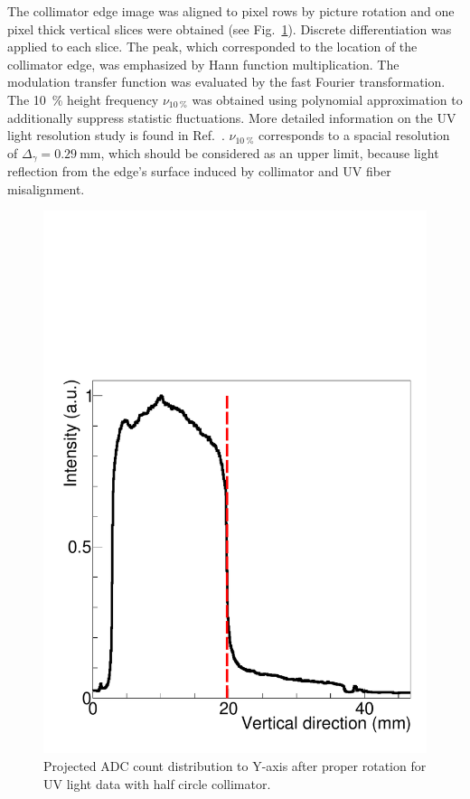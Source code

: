 \documentclass[preprint,3p,twocolumn]{elsarticle}
\begin{document}
The collimator edge image was aligned to pixel rows by picture rotation and 
one pixel thick vertical slices were obtained (see Fig.~\ref{fig:half_circle}).
Discrete differentiation was applied to each slice.
The peak,
which corresponded to the location of the collimator edge,
was emphasized by Hann function multiplication.
The modulation transfer function was evaluated by the fast Fourier transformation.
The \SI{10}{\percent} height frequency $\nu_{\SI{10}{\percent}}$ was obtained using polynomial approximation to additionally suppress statistic fluctuations.
More detailed information on the UV light resolution study is found in Ref.~\cite{Gosha}.
$\nu_{\SI{10}{\percent}}$ corresponds to a spacial resolution of $\Delta_\gamma = \SI{0.29}{\mm}$,
which should be considered as an upper limit,
because light reflection from the edge's surface induced by collimator and UV fiber misalignment.

\begin{figure}[tbp]
    \centering
	\includegraphics[width=\columnwidth]{figure/edge_image_w_uv_4_BH_axis.pdf}
	\caption{Projected ADC count distribution to Y-axis after proper rotation for UV light data with half circle collimator.}
	\label{fig:half_circle}
\end{figure}
\end{document}
